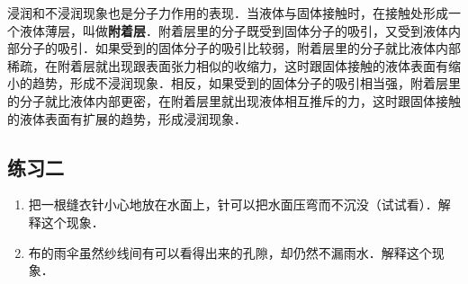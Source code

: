 浸润和不浸润现象也是分子力作用的表现．当液体与固体接触时，在接触处形成一个液体薄层，叫做\textbf{附着层}．附着层里的分子既受到固体分子的吸引，又受到液体内部分子的吸引．如果受到的固体分子的吸引比较弱，附着层里的分子就比液体内部稀疏，在附着层就出现跟表面张力相似的收缩力，这时跟固体接触的液体表面有缩小的趋势，形成不浸润现象．相反，如果受到的固体分子的吸引相当强，附着层里的分子就比液体内部更密，在附着层里就出现液体相互推斥的力，这时跟固体接触的液体表面有扩展的趋势，形成浸润现象．

\subsection*{练习二}

\begin{enumerate}
   \item 把一根缝衣针小心地放在水面上，针可以把水面压弯而不沉没（试试看）．解释这个现象．
   \item 布的雨伞虽然纱线间有可以看得出来的孔隙，却仍然不漏雨水．解释这个现象．
\end{enumerate}

